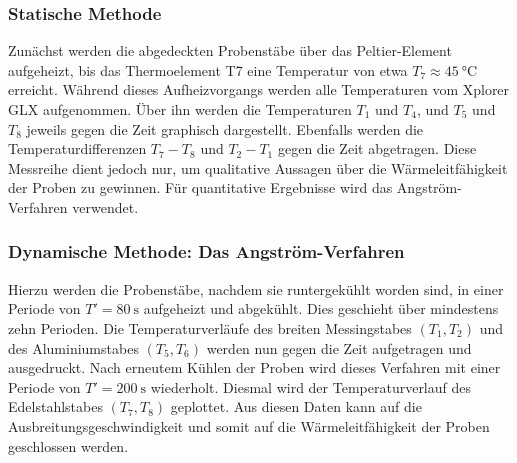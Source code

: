 \subsubsection{Statische Methode}
\label{sec:stat}
Zunächst werden die abgedeckten Probenstäbe über das Peltier-Element aufgeheizt, bis das Thermoelement T7 eine Temperatur von etwa $T_7 \approx \SI{45}{\celsius}$ erreicht.
Während dieses Aufheizvorgangs werden alle Temperaturen vom Xplorer GLX aufgenommen.
Über ihn werden die Temperaturen $T_1$ und $T_4$, und $T_5$ und $T_8$ jeweils gegen die Zeit graphisch dargestellt.
Ebenfalls werden die Temperaturdifferenzen $T_7-T_8$ und $T_2-T_1$ gegen die Zeit abgetragen.
Diese Messreihe dient jedoch nur, um qualitative Aussagen über die Wärmeleitfähigkeit der Proben zu gewinnen.
Für quantitative Ergebnisse wird das Angström-Verfahren verwendet.

\subsubsection{Dynamische Methode: Das Angström-Verfahren}
\label{sec:dyn}
Hierzu werden die Probenstäbe, nachdem sie runtergekühlt worden sind, in einer Periode von $T'=\SI{80}{\second}$ aufgeheizt und abgekühlt.
Dies geschieht über mindestens zehn Perioden.
Die Temperaturverläufe des breiten Messingstabes $(T_1,T_2)$ und des Aluminiumstabes $(T_5,T_6)$ werden nun gegen die Zeit aufgetragen und ausgedruckt.
Nach erneutem Kühlen der Proben wird dieses Verfahren mit einer Periode von $T' = \SI{200}{\second}$ wiederholt.
Diesmal wird der Temperaturverlauf des Edelstahlstabes $(T_7,T_8)$ geplottet.
Aus diesen Daten kann auf die Ausbreitungsgeschwindigkeit und somit auf die Wärmeleitfähigkeit der Proben geschlossen werden.
